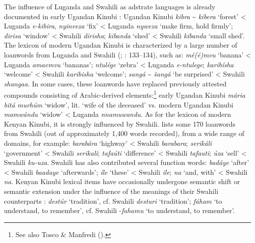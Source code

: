 \documentclass[output=paper]{langsci/langscibook}
\begin{document}
The influence of Luganda and Swahili as adstrate languages is already documented in early Ugandan Kinubi \citep{Avram2017talk}: Ugandan Kinubi \textit{kibra} {\textasciitilde} \textit{kibera} ‘forest’ < Luganda \textit{e-kibira}, \textit{nyinveza} ‘fix’ < Luganda \textit{nyweza} ‘make firm, hold firmly’; \textit{dirisa} ‘window’ < Swahili \textit{dirisha}; \textit{kibanda} ‘shed’ < Swahili \textit{kibanda} ‘small shed’. The lexicon of modern Ugandan Kinubi is characterized by a large number of loanwords from Luganda and Swahili (\citealt{Wellens2003}; \citealt{Nakao2012}: 133–134), such as: \textit{mé(é}\textit{)mvu} ‘banana’ < Luganda \textit{amaemvu} ‘bananas’; \textit{ntulége} ‘zebra’ < Luganda \textit{e-ntulege}; \textit{karibísha} ‘welcome’ < Swahili \textit{karibisha} ‘welcome’; \textit{sangá} {\textasciitilde}  \textit{šangá} ‘be surprised’ < Swahili \textit{shangaa}. In some cases, these loanwords have replaced previously attested compounds consisting of Arabic-derived elements:\footnote{See also Tosco \& Manfredi (\citeyear[509]{ToscoManfredi2013}).} early Ugandan Kinubi \textit{mária} \textit{bitá} \textit{murhúm} ‘widow’, lit. ‘wife of the deceased’ vs. modern Ugandan Kinubi \textit{mamwándu} ‘widow’ < Luganda \textit{nnamuwandu}. As for the lexicon of modern Kenyan Kinubi, it is strongly influenced by Swahili. \citet{Luffin2004} lists some 170 loanwords from Swahili (out of approximately 1,400 words recorded), from a wide range of domains, for example: \textit{barabára} ‘highway’ < Swahili \textit{barabara}; \textit{serikáli} ‘government’ < Swahili \textit{serikali}; \textit{tafaúti} ‘difference’ < Swahili \textit{tafauti}; \textit{úza} ‘sell’ < Swahili \textit{ku-uza}. Swahili has also contributed several function words: \textit{badáye} ‘after’ < Swahili \textit{baadaye} ‘afterwards’; \textit{íle} ‘these’ < Swahili \textit{ile}; \textit{na} ‘and, with’ < Swahili \textit{na}. Kenyan Kinubi lexical items have occasionally undergone semantic shift or semantic extension under the influence of the meanings of their Swahili counterparts \citep[315]{Luffin2014}: \textit{destúr} ‘tradition’, cf. Swahili \textit{desturi} ‘tradition’; \textit{fáham} ‘to understand, to remember’, cf. Swahili -\textit{fahamu} ‘to understand, to remember’. 
\end{document}
